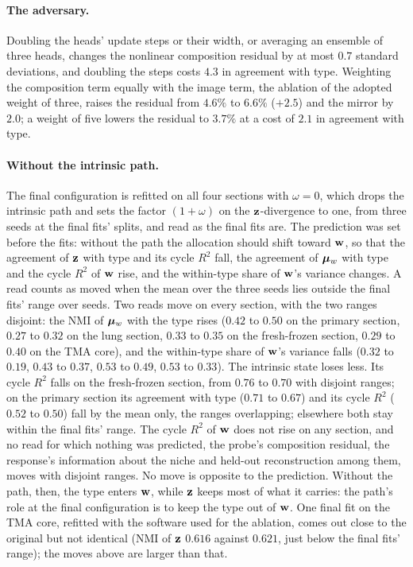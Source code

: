 \paragraph{The adversary.} Doubling the heads' update steps or their width, or averaging an ensemble of three heads, changes the nonlinear composition residual by at most $0.7$ standard deviations, and doubling the steps costs $4.3$ in agreement with type. Weighting the composition term equally with the image term, the ablation of the adopted weight of three, raises the residual from $4.6\%$ to $6.6\%$ ($+2.5$) and the mirror by $2.0$; a weight of five lowers the residual to $3.7\%$ at a cost of $2.1$ in agreement with type.

\paragraph{Without the intrinsic path.} The final configuration is refitted on all four sections with $\omega = 0$, which drops the intrinsic path and sets the factor $(1+\omega)$ on the $\mathbf{z}$-divergence to one, from three seeds at the final fits' splits, and read as the final fits are. The prediction was set before the fits: without the path the allocation should shift toward $\mathbf{w}$, so that the agreement of $\mathbf{z}$ with type and its cycle $R^2$ fall, the agreement of $\boldsymbol{\mu}_w$ with type and the cycle $R^2$ of $\mathbf{w}$ rise, and the within-type share of $\mathbf{w}$'s variance changes. A read counts as moved when the mean over the three seeds lies outside the final fits' range over seeds. Two reads move on every section, with the two ranges disjoint: the NMI of $\boldsymbol{\mu}_w$ with the type rises ($0.42$ to $0.50$ on the primary section, $0.27$ to $0.32$ on the lung section, $0.33$ to $0.35$ on the fresh-frozen section, $0.29$ to $0.40$ on the TMA core), and the within-type share of $\mathbf{w}$'s variance falls ($0.32$ to $0.19$, $0.43$ to $0.37$, $0.53$ to $0.49$, $0.53$ to $0.33$). The intrinsic state loses less. Its cycle $R^2$ falls on the fresh-frozen section, from $0.76$ to $0.70$ with disjoint ranges; on the primary section its agreement with type ($0.71$ to $0.67$) and its cycle $R^2$ ($0.52$ to $0.50$) fall by the mean only, the ranges overlapping; elsewhere both stay within the final fits' range. The cycle $R^2$ of $\mathbf{w}$ does not rise on any section, and no read for which nothing was predicted, the probe's composition residual, the response's information about the niche and held-out reconstruction among them, moves with disjoint ranges. No move is opposite to the prediction. Without the path, then, the type enters $\mathbf{w}$, while $\mathbf{z}$ keeps most of what it carries: the path's role at the final configuration is to keep the type out of $\mathbf{w}$. One final fit on the TMA core, refitted with the software used for the ablation, comes out close to the original but not identical (NMI of $\mathbf{z}$ $0.616$ against $0.621$, just below the final fits' range); the moves above are larger than that.

